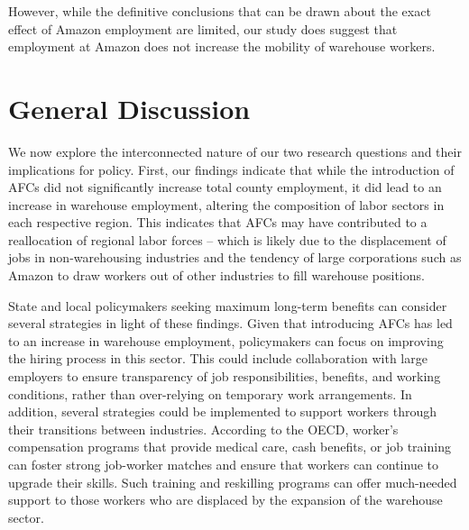 \documentclass[11pt]{article}
\begin{document}
\-\hspace{0.5cm} However, while the definitive conclusions that can be drawn about the exact effect of Amazon employment are limited, our study does suggest that employment at Amazon does not increase the mobility of warehouse workers. 


\section{General Discussion}
\begin{text}
\-\hspace{0.5cm} We now explore the interconnected nature of our two research questions and their implications for policy. First, our findings indicate that while the introduction of AFCs did not significantly increase total county employment, it did lead to an increase in warehouse employment, altering the composition of labor sectors in each respective region. This indicates that AFCs may have contributed to a reallocation of regional labor forces -- which is likely due to the displacement of jobs in non-warehousing industries and the tendency of large corporations such as Amazon to draw workers out of other industries to fill warehouse positions. 

\-\hspace{0.5cm} State and local policymakers seeking maximum long-term benefits can consider several strategies in light of these findings. Given that introducing AFCs has led to an increase in warehouse employment, policymakers can focus on improving the hiring process in this sector. This could include collaboration with large employers to ensure transparency of job responsibilities, benefits, and working conditions, rather than over-relying on temporary work arrangements. In addition, several strategies could be implemented to support workers through their transitions between industries. According to the OECD, worker's compensation programs that provide medical care, cash benefits, or job training can foster strong job-worker matches and ensure that workers can continue to upgrade their skills. Such training and reskilling programs can offer much-needed support to those workers who are  displaced by the expansion of the warehouse sector. 


\end{text}
\end{document}
